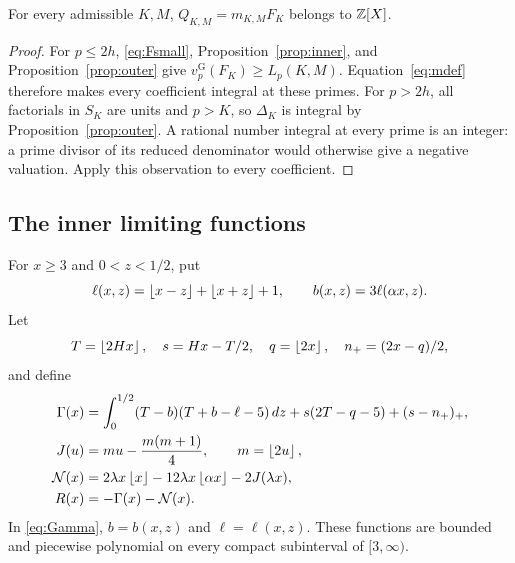 \begin{proposition}
\label{prop:integrality}
For every admissible $K,M$, $Q_{K,M}=m_{K,M}F_K$ belongs to $\mathbb Z[X]$.
\end{proposition}
\begin{proof}
For $p\le2h$, \eqref{eq:Fsmall}, Proposition~\ref{prop:inner}, and
Proposition~\ref{prop:outer} give $v_p^{\mathrm G}(F_K)\ge L_p(K,M)$.
Equation~\eqref{eq:mdef} therefore makes every coefficient integral at
these primes. For $p>2h$, all factorials in $S_K$ are units and $p>K$,
so $\Delta_K$ is integral by Proposition~\ref{prop:outer}. A rational
number integral at every prime is an integer: a prime divisor of its
reduced denominator would otherwise give a negative valuation. Apply
this observation to every coefficient.
\end{proof}

\subsection{The inner limiting functions}
For $x\ge3$ and $0<z<1/2$, put
\[
 \ell(x,z)=\left\lfloor x-z\right\rfloor+\left\lfloor x+z\right\rfloor+1,\qquad b(x,z)=3\ell(\alpha x,z).
\]
Let
\[
 T=\left\lfloor 2Hx\right\rfloor,\quad s=Hx-T/2,\quad q=\left\lfloor 2x\right\rfloor,\quad n_+=(2x-q)/2,
\]
and define
\begin{align}
 \Gamma(x)&=\int_0^{1/2}(T-b)(T+b-\ell-5)\,dz
           +s(2T-q-5)+(s-n_+)_+,\label{eq:Gamma}\\
 J(u)&=m u-\frac{m(m+1)}4,\qquad m=\left\lfloor 2u\right\rfloor,\label{eq:J}\\
 \mathcal N(x)&=2\lambda x\left\lfloor x\right\rfloor-12\lambda x\left\lfloor \alpha x\right\rfloor
                   -2J(\lambda x),\label{eq:Nlimit}\\
 R(x)&=-\Gamma(x)-\mathcal N(x).\label{eq:Rlimit}
\end{align}
In \eqref{eq:Gamma}, $b=b(x,z)$ and $\ell=\ell(x,z)$. These functions
are bounded and piecewise polynomial on every compact subinterval of
$[3,\infty)$.

